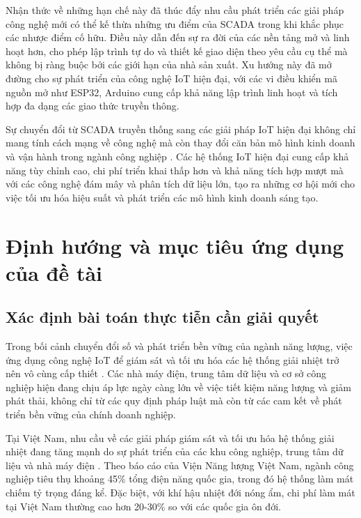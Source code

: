 \documentclass[../main.tex]{subfiles}
\begin{document}
Nhận thức về những hạn chế này đã thúc đẩy nhu cầu phát triển các giải pháp công nghệ mới có thể kế thừa những ưu điểm của SCADA trong khi khắc phục các nhược điểm cố hữu. Điều này dẫn đến sự ra đời của các nền tảng mở và linh hoạt hơn, cho phép lập trình tự do và thiết kế giao diện theo yêu cầu cụ thể mà không bị ràng buộc bởi các giới hạn của nhà sản xuất. Xu hướng này đã mở đường cho sự phát triển của công nghệ IoT hiện đại, với các vi điều khiển mã nguồn mở như ESP32, Arduino cung cấp khả năng lập trình linh hoạt và tích hợp đa dạng các giao thức truyền thông.

Sự chuyển đổi từ SCADA truyền thống sang các giải pháp IoT hiện đại không chỉ mang tính cách mạng về công nghệ mà còn thay đổi căn bản mô hình kinh doanh và vận hành trong ngành công nghiệp \cite{lee2020industry4}. Các hệ thống IoT hiện đại cung cấp khả năng tùy chỉnh cao, chi phí triển khai thấp hơn và khả năng tích hợp mượt mà với các công nghệ đám mây và phân tích dữ liệu lớn, tạo ra những cơ hội mới cho việc tối ưu hóa hiệu suất và phát triển các mô hình kinh doanh sáng tạo.

\section{Định hướng và mục tiêu ứng dụng của đề tài}
\label{sec:thesis_direction_and_application_objectives}

\subsection{Xác định bài toán thực tiễn cần giải quyết}
\label{sec:practical_problem_identification}

Trong bối cảnh chuyển đổi số và phát triển bền vững của ngành năng lượng, việc ứng dụng công nghệ IoT để giám sát và tối ưu hóa các hệ thống giải nhiệt trở nên vô cùng cấp thiết \cite{vietnam2021energy}. Các nhà máy điện, trung tâm dữ liệu và cơ sở công nghiệp hiện đang chịu áp lực ngày càng lớn về việc tiết kiệm năng lượng và giảm phát thải, không chỉ từ các quy định pháp luật mà còn từ các cam kết về phát triển bền vững của chính doanh nghiệp.

Tại Việt Nam, nhu cầu về các giải pháp giám sát và tối ưu hóa hệ thống giải nhiệt đang tăng mạnh do sự phát triển của các khu công nghiệp, trung tâm dữ liệu và nhà máy điện \cite{vietnam2021energy}. Theo báo cáo của Viện Năng lượng Việt Nam, ngành công nghiệp tiêu thụ khoảng 45\% tổng điện năng quốc gia, trong đó hệ thống làm mát chiếm tỷ trọng đáng kể. Đặc biệt, với khí hậu nhiệt đới nóng ẩm, chi phí làm mát tại Việt Nam thường cao hơn 20-30\% so với các quốc gia ôn đới.
\end{document}
